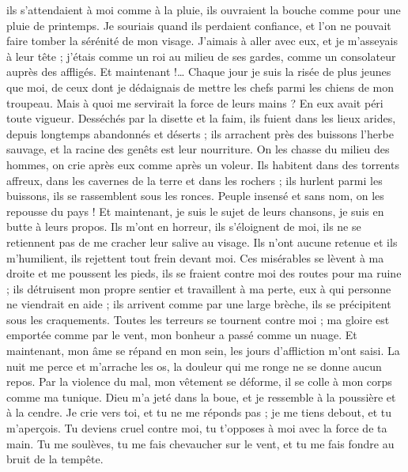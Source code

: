 \begin{multicols}{2}
ils s'attendaient à moi comme à la pluie, ils ouvraient la bouche comme pour une pluie de printemps.
Je souriais quand ils perdaient confiance, et l'on ne pouvait faire tomber la sérénité de mon visage.
J'aimais à aller avec eux, et je m'asseyais à leur tête ; j'étais comme un roi au milieu de ses gardes, comme un consolateur auprès des affligés.
\VerseOne{}Et maintenant !… Chaque jour je suis la risée de plus jeunes que moi, de ceux dont je dédaignais de mettre les chefs parmi les chiens de mon troupeau.
Mais à quoi me servirait la force de leurs mains ? En eux avait péri toute vigueur.
Desséchés par la disette et la faim, ils fuient dans les lieux arides, depuis longtemps abandonnés et déserts ;
ils arrachent près des buissons l'herbe sauvage, et la racine des genêts est leur nourriture.
On les chasse du milieu des hommes, on crie après eux comme après un voleur.
Ils habitent dans des torrents affreux, dans les cavernes de la terre et dans les rochers ;
ils hurlent parmi les buissons, ils se rassemblent sous les ronces.
Peuple insensé et sans nom, on les repousse du pays !
Et maintenant, je suis le sujet de leurs chansons, je suis en butte à leurs propos.
Ils m'ont en horreur, ils s'éloignent de moi, ils ne se retiennent pas de me cracher leur salive au visage.
Ils n'ont aucune retenue et ils m'humilient, ils rejettent tout frein devant moi.
Ces misérables se lèvent à ma droite et me poussent les pieds, ils se fraient contre moi des routes pour ma ruine ;
ils détruisent mon propre sentier et travaillent à ma perte, eux à qui personne ne viendrait en aide ;
ils arrivent comme par une large brèche, ils se précipitent sous les craquements.
Toutes les terreurs se tournent contre moi ; ma gloire est emportée comme par le vent, mon bonheur a passé comme un nuage.
Et maintenant, mon âme se répand en mon sein, les jours d'affliction m'ont saisi.
La nuit me perce et m'arrache les os, la douleur qui me ronge ne se donne aucun repos.
Par la violence du mal, mon vêtement se déforme, il se colle à mon corps comme ma tunique.
Dieu m'a jeté dans la boue, et je ressemble à la poussière et à la cendre.
Je crie vers toi, et tu ne me réponds pas ; je me tiens debout, et tu m'aperçois.
Tu deviens cruel contre moi, tu t'opposes à moi avec la force de ta main.
Tu me soulèves, tu me fais chevaucher sur le vent, et tu me fais fondre au bruit de la tempête.

\end{multicols}
